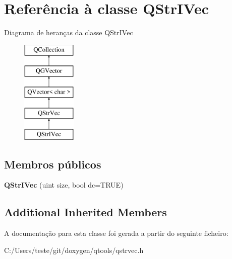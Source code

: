 \hypertarget{class_q_str_i_vec}{\section{Referência à classe Q\-Str\-I\-Vec}
\label{class_q_str_i_vec}
}
Diagrama de heranças da classe Q\-Str\-I\-Vec\begin{figure}[H]
\begin{center}
\leavevmode
\includegraphics[height=5.000000cm]{class_q_str_i_vec}
\end{center}
\end{figure}
\subsection*{Membros públicos}
\begin{DoxyCompactItemize}
\item 
\hypertarget{class_q_str_i_vec_a082a7a1c887d98688f01cff5ebed67d0}{{\bfseries Q\-Str\-I\-Vec} (uint size, bool dc=T\-R\-U\-E)}\label{class_q_str_i_vec_a082a7a1c887d98688f01cff5ebed67d0}

\end{DoxyCompactItemize}
\subsection*{Additional Inherited Members}


A documentação para esta classe foi gerada a partir do seguinte ficheiro\-:\begin{DoxyCompactItemize}
\item 
C\-:/\-Users/teste/git/doxygen/qtools/qstrvec.\-h\end{DoxyCompactItemize}
